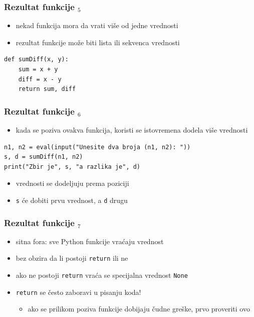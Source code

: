 \documentclass[compress]{beamer}
\begin{document}
\begin{frame}[fragile]
  \frametitle{Rezultat funkcije $_5$}
  \begin{itemize}
    \item nekad funkcija mora da vrati više od jedne vrednosti
    \item rezultat funkcije može biti lista ili sekvenca vrednosti
  \end{itemize}
\begin{verbatim}
def sumDiff(x, y):
    sum = x + y
    diff = x - y
    return sum, diff
\end{verbatim}
\end{frame}

\begin{frame}[fragile,shrink=5]
  \frametitle{Rezultat funkcije $_6$}
  \begin{itemize}
    \item kada se poziva ovakva funkcija, koristi se istovremena dodela više vrednosti
  \end{itemize}
\begin{verbatim}
n1, n2 = eval(input("Unesite dva broja (n1, n2): "))
s, d = sumDiff(n1, n2)
print("Zbir je", s, "a razlika je", d)
\end{verbatim}
  \begin{itemize}
    \item vrednosti se dodeljuju prema poziciji
    \item \texttt{s} će dobiti prvu vrednost, a \texttt{d} drugu
  \end{itemize}
\end{frame}

\begin{frame}[fragile]
  \frametitle{Rezultat funkcije $_7$}
  \begin{itemize}
    \item sitna fora: sve Python funkcije vraćaju vrednost
    \item bez obzira da li postoji \texttt{return} ili ne
    \item ako ne postoji \texttt{return} vraća se specijalna vrednost \texttt{None}
    \item \texttt{return} se često zaboravi u pisanju koda!
    \begin{itemize}
      \item ako se prilikom poziva funkcije dobijaju čudne greške, prvo proveriti ovo
    \end{itemize}
  \end{itemize}
\end{frame}
\end{document}
